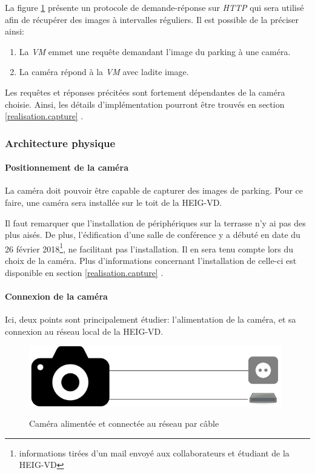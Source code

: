 La figure \ref{fig:capture_cameras} présente un protocole de demande-réponse sur \textit{HTTP} qui sera utilisé afin de récupérer des images à intervalles réguliers. Il est possible de la préciser ainsi:

\begin{enumerate}
    \item La \textit{VM} emmet une requête demandant l'image du parking à une caméra. 
    \item La caméra répond à la \textit{VM} avec ladite image.
\end{enumerate}

Les requêtes et réponses précitées sont fortement dépendantes de la caméra choisie. Ainsi, les détails d'implémentation pourront être trouvés en section \ref{realisation.capture} .


\subsubsection{Architecture physique}\label{conception.architecture.camera.physique}
\paragraph{Positionnement de la caméra}\label{conception.architecture.camera.physique.position}
La caméra doit pouvoir être capable de capturer des images de parking. Pour ce faire, une caméra sera installée sur le toit de la HEIG-VD. 

Il faut remarquer que l'installation de périphériques sur la terrasse n'y ai pas des plus aisés. De plus, l'édification d'une salle de conférence y a débuté en date du 26 février 2018\footnote{informations tirées d'un mail envoyé aux collaborateurs et étudiant de la HEIG-VD}, ne facilitant pas l'installation. Il en sera tenu compte lors du choix de la caméra. Plus d'informations concernant l'installation de celle-ci est disponible en section \ref{realisation.capture} .

\paragraph{Connexion de la caméra}

Ici, deux points sont principalement étudier: l'alimentation de la caméra, et sa connexion au réseau local de la HEIG-VD.  

\begin{figure}[H]
    \includegraphics[width=110mm]{img/conception/cam_con_1.png}
    \label{fig:capture_cameras}
    \centering
    \caption{Caméra alimentée et connectée au réseau par câble}
\end{figure}

